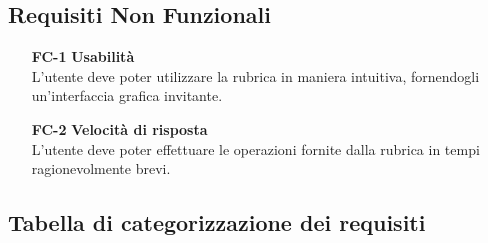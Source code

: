 \subsection{Requisiti Non Funzionali}
\begin{tcolorbox}[colback=white,colframe=black!80!white,title=\textbf{Vincoli FC}]
	\begin{itemize}[itemsep=2pt, topsep=0pt]
		\item[\textbf{FC-1}] \textbf{Usabilità}
		\\L’utente deve poter utilizzare la rubrica in maniera intuitiva,
		fornendogli un’interfaccia grafica invitante.
		
		\item[\textbf{FC-2}] \textbf{Velocità di risposta}
		\\L’utente deve poter effettuare le operazioni fornite dalla rubrica in tempi ragionevolmente brevi.		
	\end{itemize}
\end{tcolorbox}

\subsection{Tabella di categorizzazione dei requisiti}

\newpage
